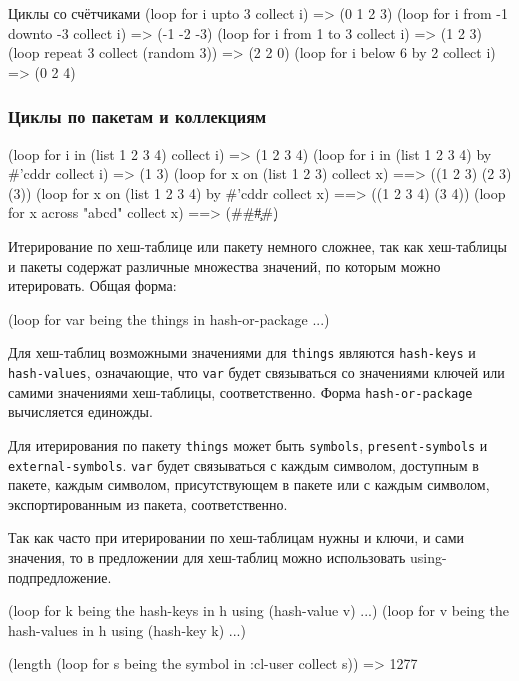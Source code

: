 \begin{cllst}{Циклы со счётчиками}{}
(loop for i upto 3 collect i)             => (0 1 2 3)
(loop for i from -1 downto -3 collect i)  => (-1 -2 -3)
(loop for i from 1 to 3 collect i)        => (1 2 3)
(loop repeat 3 collect (random 3))        => (2 2 0)
(loop for i below 6 by 2 collect i)       => (0 2 4)
\end{cllst}

\subsubsection{Циклы по пакетам и коллекциям}
\begin{cllst}{}{}
(loop for i in (list 1 2 3 4) collect i) => (1 2 3 4)
(loop for i in (list 1 2 3 4) by #'cddr collect i) => (1 3)
(loop for x on (list 1 2 3) collect x) ==> ((1 2 3) (2 3) (3))
(loop for x on (list 1 2 3 4) by #'cddr collect x) ==> ((1 2 3 4) (3 4))
(loop for x across "abcd" collect x) ==> (#\a #\b #\c #\d)
\end{cllst}

Итерирование по хеш-таблице или пакету немного сложнее, так как хеш-таблицы и пакеты содержат различные множества значений, по которым можно итерировать. Общая форма:
\begin{cllst}{}{}
(loop for var being the things in hash-or-package ...)
\end{cllst}{}

Для хеш-таблиц возможными значениями для \texttt{things} являются \texttt{hash-keys} и \texttt{hash-values}, означающие, что \texttt{var} будет связываться со значениями ключей или самими значениями хеш-таблицы, соответственно. Форма \texttt{hash-or-package} вычисляется единожды.

Для итерирования по пакету \texttt{things} может быть \texttt{symbols}, \texttt{present-symbols} и \texttt{external-symbols}. \texttt{var} будет связываться с каждым символом, доступным в пакете, каждым символом, присутствующем в пакете или с каждым символом, экспортированным из пакета, соответственно.

Так как часто при итерировании по хеш-таблицам нужны и ключи, и сами значения, то в предложении для хеш-таблиц можно использовать using-подпредложение.
\begin{cllst}{}{}
(loop for k being the hash-keys in h using (hash-value v) ...)
(loop for v being the hash-values in h using (hash-key k) ...)

(length (loop for s being the symbol in :cl-user collect s)) => 1277
\end{cllst}{}

